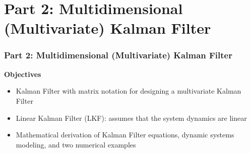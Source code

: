 \section{Part 2: Multidimensional (Multivariate) Kalman Filter}

\begin{frame}
   \frametitle{Part 2: Multidimensional (Multivariate) Kalman Filter}
		
		\textbf{Objectives}
				
		\begin{itemize}
			\item Kalman Filter with matrix notation for designing a multivariate Kalman Filter
            \item Linear Kalman Filter (LKF): assumes that the system dynamics are linear
			\item Mathematical derivation of Kalman Filter equations, dynamic systems modeling, and two numerical examples
		\end{itemize}
		
		\vspace{10pt}
		


\end{frame}


